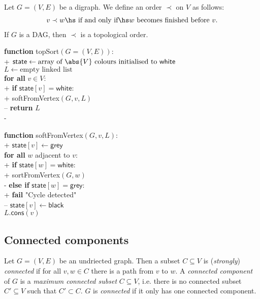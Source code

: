 \documentclass{article}
\begin{document}
\begin{theorem}
	Let $G=(V,E)$ be a digraph. We define an order $\prec$ on $V$ as follows:
	\begin{align*}
		v\prec w \hs\text{ if and only if}\hs\text{$w$ becomes finished before $v$}.
	\end{align*}
	If $G$ is a DAG, then $\prec$ is a topological order.
\end{theorem}

\begin{pseudo}
\textbf{function} \textsf{topSort}$(G=(V,E))$:										\\+
	$\textsf{state}\leftarrow\text{array of $\abs{V}$ colours
		initialised to \textsf{white}}$												\\
	$L\leftarrow\text{empty linked list}$											\\
	\textbf{for all} $v\in V$:														\\+
		\textbf{if} $\textsf{state}[v] = \textsf{white}$:							\\+
			\textsf{softFromVertex}$(G,v,L)$										\\--
    \textbf{return} $L$																\\-
\end{pseudo}

\begin{pseudo}
\textbf{function} \textsf{softFromVertex}$(G,v,L)$:									\\+
	$\textsf{state}[v]\leftarrow\textsf{grey}$										\\
	\textbf{for all} $w$ adjacent to $v$:											\\+
		\textbf{if} $\textsf{state}[w] = \textsf{white}$:							\\+
			\textsf{sortFromVertex}$(G,w)$											\\-
		\textbf{else if} $\textsf{state}[w] = \textsf{grey}$:						\\+
			\textbf{fail} "Cycle detected" 											\\--
	$\textsf{state}[v]\leftarrow \textsf{black}$									\\
	$L.\textsf{cons}(v)$
\end{pseudo}

\subsection{Connected components}

\begin{definition}[L15]
	Let $G=(V,E)$ be an undriected graph. Then a subset $C\subseteq V$ is
	(\emph{strongly}) \emph{connected} if for all $v,w\in C$ there is a path 
	from $v$ to $w$. A \emph{connected component} of $G$ is a \emph{maximum
	connected subset} $C\subseteq V$, i.e. there is no connected subset
	$C'\subseteq V$ such that $C'\subset C$. $G$ is \emph{connected} if
	it only has one connected component.
\end{definition}
\end{document}

